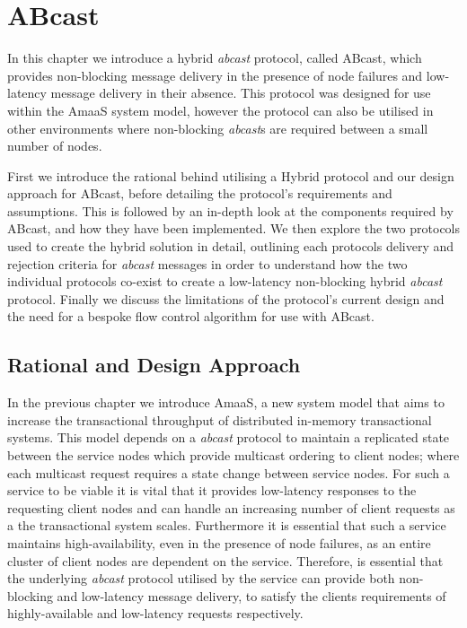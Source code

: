 \chapter{ABcast}

    \graphicspath{{Chapter4-ABcast/Figs/Vector/}{Chapter4-ABcast/Figs/}}

In this chapter we  introduce a hybrid \emph{abcast} protocol, called \textsf{ABcast}, which provides non-blocking message delivery in the presence of node failures and low-latency message delivery in their absence.  This protocol was designed for use within the \textsf{AmaaS} system model, however the protocol can also be utilised in other environments where non-blocking \emph{abcast}s are required between a small number of nodes.  

First we introduce the rational behind utilising a Hybrid protocol and our design approach for \textsf{ABcast}, before detailing the protocol's requirements and assumptions.  This is followed by an in-depth look at the components required by \textsf{ABcast}, and how they have been implemented.  We then explore the two protocols used to create the hybrid solution in detail, outlining each protocols delivery and rejection criteria for \emph{abcast} messages in order to understand how the two individual protocols co-exist to create a low-latency non-blocking hybrid \emph{abcast} protocol.  Finally we discuss the limitations of the protocol's current design and the need for a bespoke flow control algorithm for use with \textsf{ABcast}.  

\section{Rational and Design Approach}
    In the previous chapter we introduce \textsf{AmaaS}, a new system model that aims to increase the transactional throughput of distributed in-memory transactional systems.  This model depends on a \emph{abcast} protocol to maintain a replicated state between the service nodes which provide multicast ordering to client nodes; where each multicast request requires a state change between service nodes.  For such a service to be viable it is vital that it provides low-latency responses to the requesting client nodes and can handle an increasing number of client requests as a the transactional system scales.  Furthermore it is essential that such a service maintains high-availability, even in the presence of node failures, as an entire cluster of client nodes are dependent on the service.  Therefore, is essential that the underlying \emph{abcast} protocol utilised by the service can provide both non-blocking and low-latency message delivery, to satisfy the clients requirements of highly-available and low-latency requests respectively.  
    
